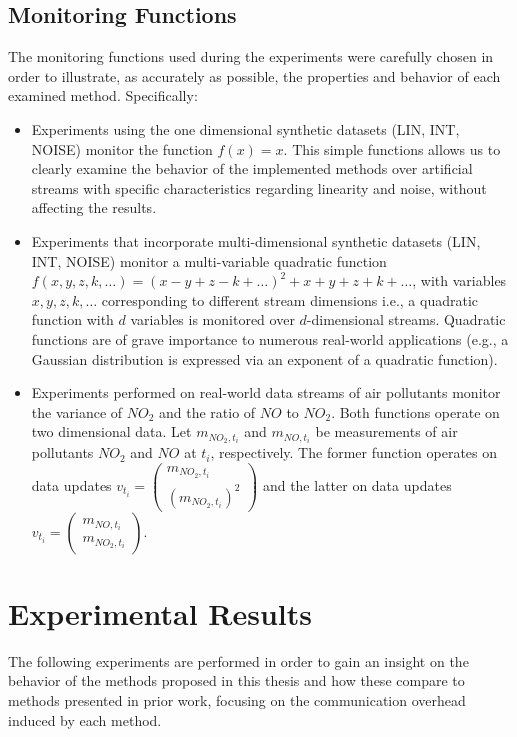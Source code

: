 \subsection{Monitoring Functions}

The monitoring functions used during the experiments were carefully chosen in order to illustrate, as accurately as possible, the properties and behavior of each examined method. Specifically:
\begin{itemize}
\item Experiments using the one dimensional synthetic datasets (LIN, INT, NOISE) monitor the function $f(x)=x$. This simple functions allows us to clearly examine the behavior of the implemented methods over artificial streams with specific characteristics regarding linearity and noise, without affecting the results.
\item Experiments that incorporate multi-dimensional synthetic datasets (LIN, INT, NOISE) monitor a multi-variable quadratic function $f(x,y,z,k,\dots)=(x-y+z-k+\dots)^2+x+y+z+k+\dots$, with variables $x,y,z,k,\dots$ corresponding to different stream dimensions i.e., a quadratic function with $d$ variables is monitored over $d$-dimensional streams. Quadratic functions are of grave importance to numerous real-world applications (e.g., a Gaussian distribution is expressed via an exponent of a quadratic function).
\item Experiments performed on real-world data streams of air pollutants monitor the variance of $NO_2$ and the ratio of $NO$ to $NO_2$. Both functions operate on two dimensional data. Let $m_{NO_2,t_i}$ and $m_{NO,t_i}$ be measurements of air pollutants $NO_2$ and $NO$ at $t_i$, respectively. The former function operates on data updates $v_{t_i}=\left(\begin{smallmatrix}m_{NO_2,t_i}\\(m_{NO_2,t_i})^2\end{smallmatrix}\right)$ and the latter on data updates $v_{t_i}=\left(\begin{smallmatrix}m_{NO,t_i}\\m_{NO_2,t_i}\end{smallmatrix}\right)$.
\end{itemize}

\section{Experimental Results} \label{sec:exp}

The following experiments are performed in order to gain an insight on the behavior of the methods proposed in this thesis and how these compare to methods presented in prior work, focusing on the communication overhead induced by each method. 

